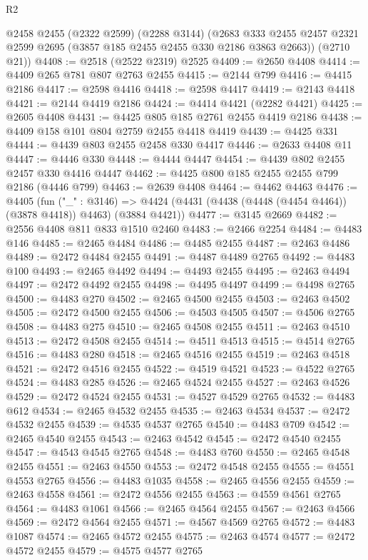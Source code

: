 \begin{lexlean}{R2}
\begin{coremodule}
      @2458
      @2455
      (@2322 @2599)
      (@2288 @3144)
      (@2683 @333 @2455 @2457 @2321 @2599 @2695 (@3857 @185 @2455 @2455 @330 @2186 @3863 @2663))
      (@2710 @21))
@4408 := @2518 (@2522 @2319) @2525
@4409 := @2650 @4408
@4414 := @4409 @265 @781 @807 @2763 @2455
@4415 := @2144 @799
@4416 := @4415 @2186
@4417 := @2598 @4416
@4418 := @2598 @4417
@4419 := @2143 @4418
@4421 := @2144 @4419 @2186
@4424 := @4414 @4421 (@2282 @4421)
@4425 := @2605 @4408
@4431 := @4425 @805 @185 @2761 @2455 @4419 @2186
@4438 := @4409 @158 @101 @804 @2759 @2455 @4418 @4419
@4439 := @4425 @331
@4444 := @4439 @803 @2455 @2458 @330 @4417
@4446 := @2633 @4408 @11
@4447 := @4446 @330
@4448 := @4444 @4447
@4454 := @4439 @802 @2455 @2457 @330 @4416 @4447
@4462 := @4425 @800 @185 @2455 @2455 @799 @2186 (@4446 @799)
@4463 := @2639 @4408
@4464 := @4462 @4463
@4476 := @4405
    (fun ("_" : @3146) =>
    @4424 (@4431 (@4438 (@4448 (@4454 @4464)) (@3878 @4418)) @4463) (@3884 @4421))
@4477 := @3145 @2669
@4482 := @2556 @4408 @811 @833 @1510 @2460
@4483 := @2466 @2254
@4484 := @4483 @146
@4485 := @2465 @4484
@4486 := @4485 @2455
@4487 := @2463 @4486
@4489 := @2472 @4484 @2455
@4491 := @4487 @4489 @2765
@4492 := @4483 @100
@4493 := @2465 @4492
@4494 := @4493 @2455
@4495 := @2463 @4494
@4497 := @2472 @4492 @2455
@4498 := @4495 @4497
@4499 := @4498 @2765
@4500 := @4483 @270
@4502 := @2465 @4500 @2455
@4503 := @2463 @4502
@4505 := @2472 @4500 @2455
@4506 := @4503 @4505
@4507 := @4506 @2765
@4508 := @4483 @275
@4510 := @2465 @4508 @2455
@4511 := @2463 @4510
@4513 := @2472 @4508 @2455
@4514 := @4511 @4513
@4515 := @4514 @2765
@4516 := @4483 @280
@4518 := @2465 @4516 @2455
@4519 := @2463 @4518
@4521 := @2472 @4516 @2455
@4522 := @4519 @4521
@4523 := @4522 @2765
@4524 := @4483 @285
@4526 := @2465 @4524 @2455
@4527 := @2463 @4526
@4529 := @2472 @4524 @2455
@4531 := @4527 @4529 @2765
@4532 := @4483 @612
@4534 := @2465 @4532 @2455
@4535 := @2463 @4534
@4537 := @2472 @4532 @2455
@4539 := @4535 @4537 @2765
@4540 := @4483 @709
@4542 := @2465 @4540 @2455
@4543 := @2463 @4542
@4545 := @2472 @4540 @2455
@4547 := @4543 @4545 @2765
@4548 := @4483 @760
@4550 := @2465 @4548 @2455
@4551 := @2463 @4550
@4553 := @2472 @4548 @2455
@4555 := @4551 @4553 @2765
@4556 := @4483 @1035
@4558 := @2465 @4556 @2455
@4559 := @2463 @4558
@4561 := @2472 @4556 @2455
@4563 := @4559 @4561 @2765
@4564 := @4483 @1061
@4566 := @2465 @4564 @2455
@4567 := @2463 @4566
@4569 := @2472 @4564 @2455
@4571 := @4567 @4569 @2765
@4572 := @4483 @1087
@4574 := @2465 @4572 @2455
@4575 := @2463 @4574
@4577 := @2472 @4572 @2455
@4579 := @4575 @4577 @2765

\end{coremodule}
\end{lexlean}
